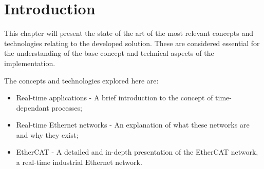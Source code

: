 \section{Introduction} \label{sec:sota_intro}

This chapter will present the state of the art of the most relevant concepts and technologies relating to the developed solution.
These are considered essential for the understanding of the base concept and technical aspects of the implementation.

The concepts and technologies explored here are:

\begin{itemize}
	\item Real-time applications - A brief introduction to the concept of time-dependant processes;

	\item Real-time Ethernet networks - An explanation of what these networks are and why they exist;

	\item EtherCAT - A detailed and in-depth presentation of the EtherCAT network, a real-time industrial Ethernet network.
\end{itemize}
